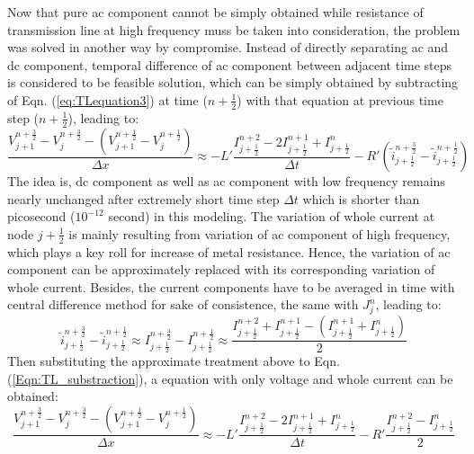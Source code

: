 \documentclass[11pt,final]{scrbook}
\begin{document}
Now that pure ac component cannot be simply obtained while resistance of transmission line at high frequency muss be taken into consideration, the problem was solved in another way by compromise. Instead of directly separating ac and dc component, temporal difference of ac component between adjacent time steps is considered to be feasible solution, which can be simply obtained by subtracting of Eqn. (\ref{eq:TLequation3}) at time ($n+\frac{1}{2}$) with that equation at previous time step ($n+\frac{1}{2}$), leading to:
\begin{equation}
\frac { { V }_{ j+1 }^{ n+\frac{3}{2} }-{ V }_{ j }^{ n+\frac{3}{2}}-({ V }_{ j+1 }^{ n+\frac{1}{2} }-{ V }_{ j }^{ n+\frac{1}{2} }) }{ \Delta x } \approx -L'\frac { { I }_{ j+\frac{1}{2} }^{ n+2 }-2{ I }_{ j+\frac{1}{2} }^{ n+1 }+{ I }_{ j+\frac{1}{2} }^{ n } }{ \Delta t } -R' (\widetilde{ i } _{ j+\frac{1}{2} }^{ n+\frac{3}{2} }-\widetilde{ i } _{ j+\frac{1}{2} }^{ n+\frac{1}{2} })\label{Eq:TL_substraction}
\end{equation}
The idea is, dc component as well as ac component with low frequency remains nearly unchanged after extremely short time step $\Delta t$ which is shorter than picosecond ($10^{-12}$ second) in this modeling. The variation of whole current at node $j+\frac{1}{2}$ is mainly resulting from variation of ac component of high frequency, which plays a key roll for increase of metal resistance. Hence, the variation of ac component can be approximately replaced with its corresponding variation of whole current. Besides, the current components have to be averaged in time with central difference method for sake of consistence, the same with $J_{j}^{n}$, leading to:
\begin{equation}
\tilde{ i }_{ j+\frac { 1 }{ 2 }  }^{ n+\frac{3}{2} }-\tilde{ i }_{ j+\frac { 1 }{ 2 }  }^{ n+\frac{1}{2} }\approx{ I }_{ j+\frac { 1 }{ 2 }  }^{ n+\frac{3}{2} }-{ I }_{ j+\frac { 1 }{ 2 }  }^{ n+\frac{1}{2} } \approx \frac{{ I }_{ j+\frac { 1 }{ 2 }  }^{ n+2 }+{ I }_{ j+\frac { 1 }{ 2 }  }^{ n+1 }-({ I }_{ j+\frac { 1 }{ 2 }  }^{ n+1 }+{ I }_{ j+\frac { 1 }{ 2 }  }^{ n })}{2}\label{Eq:ac_Current}
\end{equation}
Then substituting the approximate treatment above to Eqn. (\ref{Eqn:TL_substraction}),  a equation with only voltage and whole current can be obtained:
\begin{equation}
\frac { { V }_{ j+1 }^{ n+\frac{3}{2} }-{ V }_{ j }^{ n+\frac{3}{2}}-({ V }_{ j+1 }^{ n+\frac{1}{2} }-{ V }_{ j }^{ n+\frac{1}{2} }) }{ \Delta x } \approx -L'\frac { { I }_{ j+\frac{1}{2} }^{ n+2 }-2{ I }_{ j+\frac{1}{2} }^{ n+1 }+{ I }_{ j+\frac{1}{2} }^{ n } }{ \Delta t } -R' \frac{{ I }_{ j+\frac { 1 }{ 2 }  }^{ n+2 }-{ I }_{ j+\frac { 1 }{ 2 }  }^{ n }}{2}
\end{equation}
\end{document}
